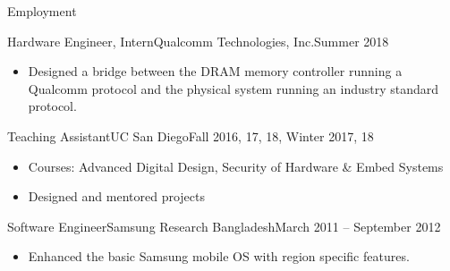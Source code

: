 \documentclass[]{mcdowellcv}
\begin{document}
	\makeheader
	
	\begin{cvsection}{Employment}
		\begin{cvsubsection}{Hardware Engineer, Intern}{Qualcomm Technologies, Inc.}{Summer 2018}			
			\begin{itemize}
				\item Designed a bridge between the DRAM memory controller running a Qualcomm protocol and the physical system running an industry standard protocol.
			\end{itemize}
		\end{cvsubsection}
		
		\begin{cvsubsection}{Teaching Assistant}{UC San Diego}{Fall 2016, 17, 18, Winter 2017, 18}	
			\begin{itemize}
				\item Courses: Advanced Digital Design, Security of Hardware \& Embed Systems
				\item Designed and mentored projects
			\end{itemize}
		\end{cvsubsection}
		
		\begin{cvsubsection}{Software Engineer}{Samsung Research Bangladesh}{March 2011 -- September 2012}		
			\begin{itemize}
				\item Enhanced the basic Samsung mobile OS with region specific features.
			\end{itemize}
		\end{cvsubsection}
	\end{cvsection}
	
\end{document}

